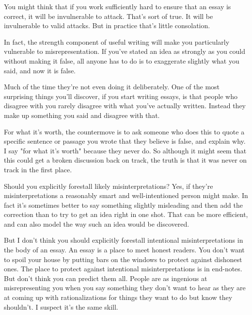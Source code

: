 You might think that if you work
                  sufficiently hard to ensure that an essay is correct, it will
                  be invulnerable to attack. That's sort of true. It will be
                  invulnerable to valid attacks. But in practice that's little
                  consolation.

In fact, the strength component of
                  useful writing will make you particularly vulnerable to
                  misrepresentation. If you've stated an idea as strongly as you
                  could without making it false, all anyone has to do is to
                  exaggerate slightly what you said, and now it is false.

Much
                  of the time they're not even doing it deliberately. One of the
                  most surprising things you'll discover, if you start writing
                  essays, is that people who disagree with you rarely disagree
                  with what you've actually written. Instead they make up
                  something you said and disagree with that.

For what
                  it's worth, the countermove is to ask someone who does this to
                  quote a specific sentence or passage you wrote that they
                  believe is false, and explain why. I say "for what it's worth"
                  because they never do. So although it might seem that this
                  could get a broken discussion back on track, the truth is that
                  it was never on track in the first place.

Should
                  you explicitly forestall likely misinterpretations? Yes, if
                  they're misinterpretations a reasonably smart and
                  well-intentioned person might make. In fact it's sometimes
                  better to say something slightly misleading and then add the
                  correction than to try to get an idea right in one shot. That
                  can be more efficient, and can also model the way such an idea
                  would be discovered.

But I don't think you should
                  explicitly forestall intentional misinterpretations in the
                  body of an essay. An essay is a place to meet honest readers.
                  You don't want to spoil your house by putting bars on the
                  windows to protect against dishonest ones. The place to
                  protect against intentional misinterpretations is in
                  end-notes. But don't think you can predict them all. People
                  are as ingenious at misrepresenting you when you say something
                  they don't want to hear as they are at coming up with
                  rationalizations for things they want to do but know they
                  shouldn't. I suspect it's the same skill.


